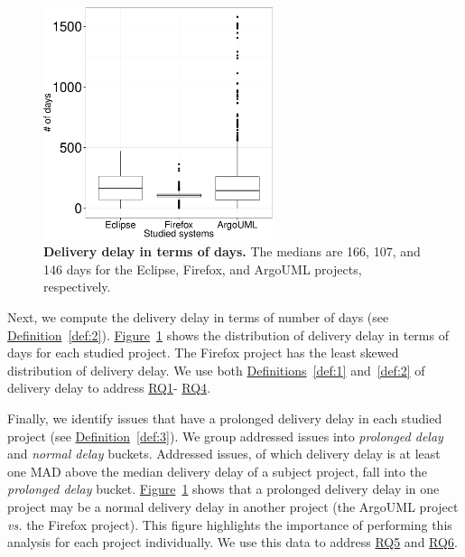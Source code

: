 \begin{figure}
	\centering
	\includegraphics[width=0.60\textwidth,keepaspectratio]
	{chapters/chapter4/figures/boxplot-days-per-system.pdf}
	\caption{\textbf{Delivery delay in terms of days.} The medians 
		are 166, 107, and 146 days for the Eclipse, Firefox, and
		ArgoUML projects, respectively.
	}
	\label{ch4:fig:beanplot_days}
\end{figure}

Next, we compute the delivery delay in terms of number of days (see
\hyperref[def:2]{Definition}~\ref{def:2}).
\hyperref[ch4:fig:beanplot_days]{Figure}~\ref{ch4:fig:beanplot_days} shows the
distribution of delivery delay in terms of days for each studied project. The
Firefox project has the least skewed distribution of delivery delay. We use both
\hyperref[def:1]{Definitions}~\ref{def:1} and~\ref{def:2} of delivery delay to
address \hyperref[ch4:rq1]{RQ1}-\DIFdelbegin %
\DIFdelend \DIFaddbegin \hyperref[ch4:rq4]{RQ4}\DIFaddend .   

Finally, we identify issues that have a prolonged delivery delay in each studied
project (see \hyperref[def:3]{Definition}~\ref{def:3}). We group addressed
issues into \textit{prolonged delay} and \textit{normal delay} buckets.
Addressed issues, of which delivery delay is at least one MAD above the median
delivery delay of a subject project, fall into the \textit{prolonged delay}
bucket.  \hyperref[ch4:fig:beanplot_days]{Figure}~\ref{ch4:fig:beanplot_days}
shows that a prolonged delivery delay in one project may be a normal delivery
delay in another project (\eg the ArgoUML project {\em vs.} the Firefox
project). This figure highlights the importance of performing this analysis for
each project individually. We use this data to address \hyperref[ch4:rq5]{RQ5}
and \hyperref[ch4:rq6]{RQ6}.

